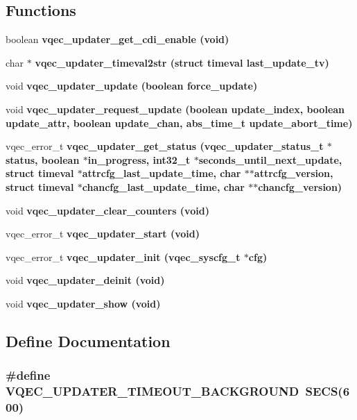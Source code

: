 \subsection*{Functions}
\begin{CompactItemize}
\item 
boolean \bf{vqec\_\-updater\_\-get\_\-cdi\_\-enable} (void)
\item 
char $\ast$ \bf{vqec\_\-updater\_\-timeval2str} (struct timeval last\_\-update\_\-tv)
\item 
void \bf{vqec\_\-updater\_\-update} (boolean force\_\-update)
\item 
void \bf{vqec\_\-updater\_\-request\_\-update} (boolean update\_\-index, boolean update\_\-attr, boolean update\_\-chan, abs\_\-time\_\-t update\_\-abort\_\-time)
\item 
vqec\_\-error\_\-t \bf{vqec\_\-updater\_\-get\_\-status} (\bf{vqec\_\-updater\_\-status\_\-t} $\ast$status, boolean $\ast$in\_\-progress, int32\_\-t $\ast$seconds\_\-until\_\-next\_\-update, struct timeval $\ast$attrcfg\_\-last\_\-update\_\-time, char $\ast$$\ast$attrcfg\_\-version, struct timeval $\ast$chancfg\_\-last\_\-update\_\-time, char $\ast$$\ast$chancfg\_\-version)
\item 
void \bf{vqec\_\-updater\_\-clear\_\-counters} (void)
\item 
vqec\_\-error\_\-t \bf{vqec\_\-updater\_\-start} (void)
\item 
vqec\_\-error\_\-t \bf{vqec\_\-updater\_\-init} (\bf{vqec\_\-syscfg\_\-t} $\ast$cfg)
\item 
void \bf{vqec\_\-updater\_\-deinit} (void)
\item 
void \bf{vqec\_\-updater\_\-show} (void)
\end{CompactItemize}


\subsection{Define Documentation}
\subsubsection{\setlength{\rightskip}{0pt plus 5cm}\#define VQEC\_\-UPDATER\_\-TIMEOUT\_\-BACKGROUND~SECS(600)}\label{vqec__updater_8h_183bbd5b696c9587a774cb45f85285bf}



